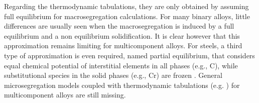 Regarding the thermodynamic tabulations, they are only obtained by assuming full equilibrium for macrosegregation calculations. 
For many binary alloys, little differences are usually seen when the macrosegregation is induced by a full equilibrium and a non equilibrium solidification.
It is clear however that this approximation remains limiting for multicomponent alloys. 
For steels, a third type of approximation is even required, named partial equilibrium, that considers equal chemical potential 
of interstitial elements in all phases (e.g., C), while substitutional species in the solid phases (e.g., Cr) are frozen \citep{koshikawa_computation_2014}. 
General microsegregation models coupled with thermodynamic tabulations (e.g. \citep{tourret_multiple_2011}) for multicomponent alloys are still missing. 




